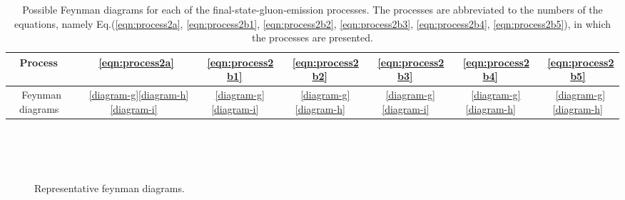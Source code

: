 \documentclass[preprint,showpacs,preprintnumbers,amssymb,aps]{revtex4}
\begin{document}
\begin{table}[htbp]
\begin{center}
\caption{
Possible Feynman diagrams for each of the final-state-gluon-emission processes.
The processes are abbreviated to the numbers of the equations,
namely Eq.(\ref{eqn:process2a}, \ref{eqn:process2b1}, \ref{eqn:process2b2}, \ref{eqn:process2b3}, \ref{eqn:process2b4}, \ref{eqn:process2b5}),
in which the processes are presented.
}
\begin{tabular}{ccccccc}
\hline
\hline
Process~&~\ref{eqn:process2a}~&~\ref{eqn:process2b1}~&~\ref{eqn:process2b2}~&~\ref{eqn:process2b3}~&~\ref{eqn:process2b4}~&~\ref{eqn:process2b5} \\
\hline
Feynman diagrams~&~\ref{diagram-g}\ref{diagram-h}\ref{diagram-i}~&~\ref{diagram-g}\ref{diagram-i}~&~\ref{diagram-g}\ref{diagram-h}~
&~\ref{diagram-g}\ref{diagram-i}~&~\ref{diagram-g}\ref{diagram-h}~&~\ref{diagram-g}\ref{diagram-h} \\
\hline
\hline
\end{tabular}
\label{tab:diag}
\end{center}
\end{table}

\begin{figure} %
  \begin{center}
  \subfloat[]{\texttt{[image: lo1]} \label{diagram-a}} 
  \subfloat[]{\texttt{[image: lo2]} \label{diagram-b}}
  \subfloat[]{\texttt{[image: lo3]} \label{diagram-c}} \\
   \\
   \\
  \end{center}
  \caption{Representative feynman diagrams.  }
  \label{fig:feyndiag}
\end{figure}
\end{document}
